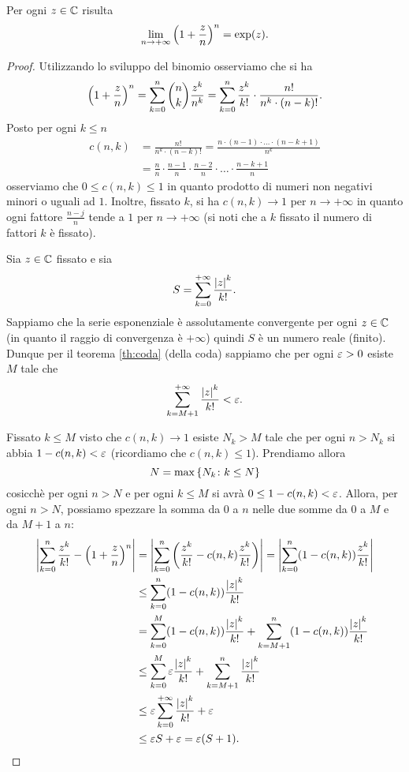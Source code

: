 \begin{theorem}%
\label{th:limite_notevole_esponenziale_complesso}%
\mymark{*}%
Per ogni $z\in \mathbb C$ risulta
\[
  \lim_{n \to +\infty} {\left( 1+\frac z n \right)}^n  = \exp(z).
\]
\end{theorem}
%
\begin{proof}
\mymark{*}
Utilizzando lo sviluppo del binomio osserviamo che si ha
\[
 {\left( 1+\frac z n \right)}^n
 = \sum_{k=0}^n \binom{n}{k} \frac{z^k}{n^k}
 = \sum_{k=0}^n \frac{z^k}{k!} \cdot \frac{n!}{n^k\cdot (n-k)!}.
\]
Posto per ogni $k\le n$
\begin{align*}
 c(n,k)
  &= \frac{n!}{n^k\cdot (n-k)!}
  = \frac{n \cdot (n-1) \cdot \ldots \cdot(n-k+1)}{n^k} \\
  &= \frac{n}{n}\cdot {\frac {n-1} n} \cdot \frac {n-2} {n} \cdot \ldots \cdot \frac{n-k+1}{n}
\end{align*}
osserviamo che $0\le c(n,k)\le 1$ in quanto
prodotto di numeri non negativi minori o uguali ad $1$.
Inoltre, fissato $k$, si ha $c(n,k)  \to 1$ per $n\to +\infty$
in quanto ogni fattore $\frac{n-j}{n}$ tende
a $1$ per $n\to +\infty$ (si noti che a $k$ fissato il numero di fattori $k$ è
fissato).


Sia $z\in \mathbb C$ fissato e sia
\[
  S = \sum_{k=0}^{+\infty} \frac{{\left|z\right|}^k}{k!}.
\]
Sappiamo che la serie esponenziale è assolutamente convergente
per ogni $z\in \mathbb C$ (in quanto il raggio di convergenza è $+\infty$)
quindi $S$ è un numero reale (finito).
Dunque per il teorema \ref{th:coda} (della coda) sappiamo che per ogni $\varepsilon>0$
esiste $M$ tale che
\[
   \sum_{k=M+1}^{+\infty} \frac{{\left|z\right|}^k}{k!} < \varepsilon.
\]

Fissato $k\le M$ visto che $c(n,k)\to 1$
esiste $N_k > M$ tale che per ogni $n>N_k$
si abbia $1-c(n,k) < \varepsilon$
(ricordiamo che $c(n,k)\le 1$).
Prendiamo allora
\[
  N=\max{\left\{ N_k\colon k\le N \right\}}
\]
cosicchè per ogni $n>N$ e per ogni $k\le M$ si avrà $0 \le 1-c(n,k) < \varepsilon$.
Allora, per ogni $n>N$, possiamo spezzare la somma da $0$ a $n$ nelle due
somme da $0$ a $M$ e da $M+1$ a $n$:
\begin{align*}
{\left|\sum_{k=0}^n \frac{z^k}{k!} - {\left( 1+\frac z n \right)}^n\right|}
&= {\left|\sum_{k=0}^n {\left( \frac{z^k}{k!} - c(n,k)\frac{z^k}{k!} \right)}\right|}
= {\left|\sum_{k=0}^n  (1-c(n,k))\frac{z^k}{k!}\right|} \\
&\le \sum_{k=0}^n  (1-c(n,k))\frac{{\left|z\right|}^k}{k!} \\
  &= \sum_{k=0}^{M} (1-c(n,k)) \frac{{\left|z\right|}^k}{k!}
   + \sum_{k=M+1}^n (1-c(n,k)) \frac{{\left|z\right|}^k}{k!} \\
&\le \sum_{k=0}^{M} \varepsilon \frac{{\left|z\right|}^k}{k!}
   + \sum_{k=M+1}^n \frac{{\left|z\right|}^k}{k!} \\
&\le  \varepsilon \sum_{k=0}^{+\infty} \frac{{\left|z\right|}^k}{k!}
    + \varepsilon \\
&\le \varepsilon S + \varepsilon
= \varepsilon (S+1).
\end{align*}


\end{proof}
